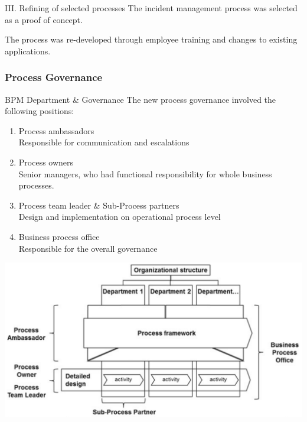 \documentclass{beamer}
\begin{document}
\begin{frame}{III. Refining of selected processes}
    The incident management process was selected as a proof of concept.

    \vspace{1em}

    The process was re-developed through employee training and changes to existing applications.
\end{frame}

\subsubsection{Process Governance}
\begin{frame}{BPM Department \& Governance}
    The new process governance involved the following positions:
    \begin{enumerate}
        \item Process ambassadors\\Responsible for communication and escalations
        \item Process owners\\Senior managers, who had functional responsibility for whole business processes.
        \item Process team leader \& Sub-Process partners\\Design and implementation on operational process level
        \item Business process office\\Responsible for the overall governance
    \end{enumerate}
\end{frame}

\begin{frame}
    \begin{center}
        \includegraphics[width=1.0\textwidth]{proj_bpmDepartment.png}
    \end{center}
\end{frame}
\end{document}
